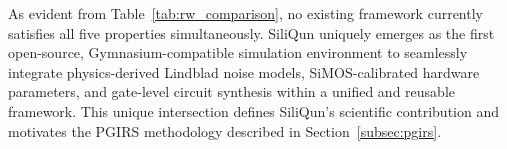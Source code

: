 As evident from Table~\ref{tab:rw_comparison}, no existing framework
currently satisfies all five properties simultaneously. SiliQun uniquely
emerges as the first open-source, Gymnasium-compatible simulation
environment to seamlessly integrate physics-derived Lindblad noise models,
SiMOS-calibrated hardware parameters, and gate-level circuit synthesis
within a unified and reusable framework. This unique intersection defines SiliQun's scientific
contribution and motivates the PGIRS methodology described in
Section~\ref{subsec:pgirs}.

%
%
%
%
%
%
%
